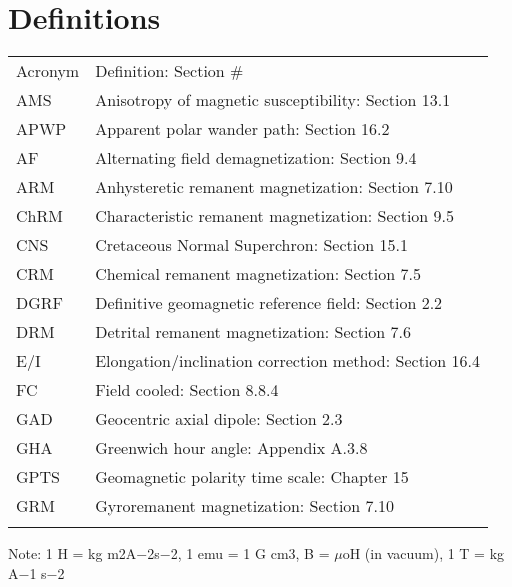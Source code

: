 \documentclass[draft,plain]{tauxe}
\begin{document}
\section{Definitions}

\begin{table}
\vspace*{-20pt}
{\begin{tabular*}{\textwidth}{@{}ll}
\toprule
Acronym  & Definition: Section \# \\
\colrule
AMS	&Anisotropy of magnetic susceptibility: Section 13.1\\
APWP &Apparent polar wander path: Section 16.2\\
AF &Alternating field demagnetization: Section 9.4\\
ARM &Anhysteretic remanent magnetization: Section 7.10\\
ChRM &Characteristic remanent magnetization: Section 9.5\\
CNS	&Cretaceous Normal Superchron: Section 15.1\\
CRM &Chemical remanent magnetization: Section 7.5\\
DGRF &Definitive geomagnetic reference field: Section 2.2\\
DRM &Detrital remanent magnetization: Section 7.6\\
E/I &Elongation/inclination correction method: Section 16.4\\
FC &Field cooled: Section 8.8.4\\
GAD &Geocentric axial dipole: Section 2.3\\
GHA &Greenwich hour angle: Appendix A.3.8\\
GPTS &Geomagnetic polarity time scale: Chapter 15\\
GRM &Gyroremanent magnetization: Section 7.10\\
\botrule
\end{tabular*}}
{Note: 1 H = kg m2A$-$2s$-$2, 1 emu = 1 G cm3, B = $\mu$oH (in vacuum), 1 T = kg A$-$1 s$-$2}
\end{table}
\end{document}
